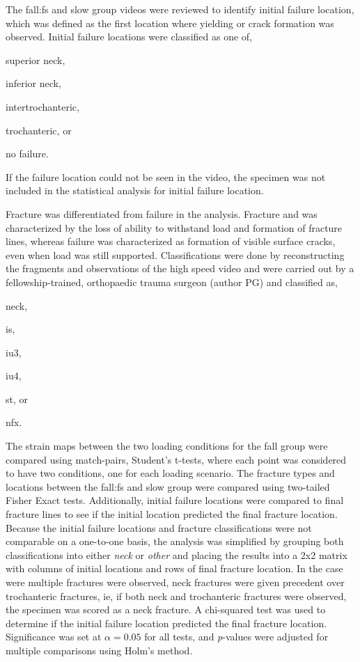 The fall:\ac{fs} and slow group videos were reviewed to identify initial failure location, which was defined as the first location where yielding or crack formation was observed.
Initial failure locations were classified as one of,
\begin{inparaenum}[(a)]
\item superior neck,
\item inferior neck,
\item intertrochanteric,
\item trochanteric, or
\item no failure.
\end{inparaenum}
If the failure location could not be seen in the video, the specimen was not included in the statistical analysis for initial failure location.

Fracture was differentiated from failure in the analysis.
Fracture and was characterized by the loss of ability to withstand load and formation of fracture lines, whereas failure was characterized as formation of visible surface cracks, even when load was still supported.
Classifications were done by reconstructing the fragments and observations of the high speed video and were carried out by a fellowship-trained, orthopaedic trauma surgeon (author PG) and classified as,
\begin{inparaenum}[(a)]
\item \ac{neck},
\item \ac{is},
\item \ac{iu3},
\item \ac{iu4},
\item \ac{st}, or
\item \ac{nfx}.
\end{inparaenum}

The strain maps between the two loading conditions for the fall group were compared using match-pairs, Student's t-tests, where each point was considered to have two conditions, one for each loading scenario.
The fracture types and locations between the fall:\ac{fs} and slow group were compared using two-tailed Fisher Exact tests.
Additionally, initial failure locations were compared to final fracture lines to see if the initial location predicted the final fracture location.
Because the initial failure locations and fracture classifications were not comparable on a one-to-one basis, the analysis was simplified by grouping both classifications into either \textit{neck} or \textit{other} and placing the results into a 2x2 matrix with columns of initial locations and rows of final fracture location.
In the case were multiple fractures were observed, neck fractures were given precedent over trochanteric fractures, \ac{ie}, if both neck and trochanteric fractures were observed, the specimen was scored as a neck fracture.
A chi-squared test was used to determine if the initial failure location predicted the final fracture location.
Significance was set at $\alpha=0.05$ for all tests, and \textit{p}-values were adjusted for multiple comparisons using Holm's method.

